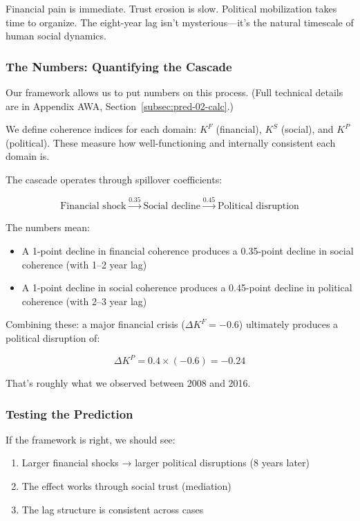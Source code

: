 Financial pain is immediate. Trust erosion is slow. Political mobilization 
takes time to organize. The eight-year lag isn't mysterious---it's the 
natural timescale of human social dynamics.

\subsubsection{The Numbers: Quantifying the Cascade}

Our framework allows us to put numbers on this process. (Full technical 
details are in Appendix AWA, Section~\ref{subsec:pred-02-calc}.)

We define coherence indices for each domain: $K^F$ (financial), 
$K^S$ (social), and $K^P$ (political). These measure how well-functioning 
and internally consistent each domain is.

The cascade operates through spillover coefficients:

\begin{equation}
\text{Financial shock} \xrightarrow{0.35} \text{Social decline} \xrightarrow{0.45} \text{Political disruption}
\end{equation}

The numbers mean:
\begin{itemize}
    \item A 1-point decline in financial coherence produces a 0.35-point 
    decline in social coherence (with 1--2 year lag)
    \item A 1-point decline in social coherence produces a 0.45-point 
    decline in political coherence (with 2--3 year lag)
\end{itemize}

Combining these: a major financial crisis ($\Delta K^F = -0.6$) ultimately 
produces a political disruption of:

\begin{equation}
\Delta K^P = 0.4 \times (-0.6) = -0.24
\end{equation}

That's roughly what we observed between 2008 and 2016.

\subsubsection{Testing the Prediction}

If the framework is right, we should see:

\begin{enumerate}
    \item Larger financial shocks → larger political disruptions (8 years later)
    \item The effect works through social trust (mediation)
    \item The lag structure is consistent across cases
\end{enumerate}

